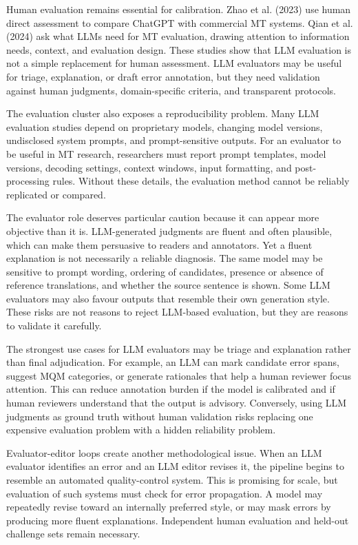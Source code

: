 \documentclass[11pt]{article}
\begin{document}
Human evaluation remains essential for calibration. Zhao et al. (2023) use human direct assessment to compare ChatGPT with commercial MT systems. Qian et al. (2024) ask what LLMs need for MT evaluation, drawing attention to information needs, context, and evaluation design. These studies show that LLM evaluation is not a simple replacement for human assessment. LLM evaluators may be useful for triage, explanation, or draft error annotation, but they need validation against human judgments, domain-specific criteria, and transparent protocols.

The evaluation cluster also exposes a reproducibility problem. Many LLM evaluation studies depend on proprietary models, changing model versions, undisclosed system prompts, and prompt-sensitive outputs. For an evaluator to be useful in MT research, researchers must report prompt templates, model versions, decoding settings, context windows, input formatting, and post-processing rules. Without these details, the evaluation method cannot be reliably replicated or compared.


The evaluator role deserves particular caution because it can appear more objective than it is. LLM-generated judgments are fluent and often plausible, which can make them persuasive to readers and annotators. Yet a fluent explanation is not necessarily a reliable diagnosis. The same model may be sensitive to prompt wording, ordering of candidates, presence or absence of reference translations, and whether the source sentence is shown. Some LLM evaluators may also favour outputs that resemble their own generation style. These risks are not reasons to reject LLM-based evaluation, but they are reasons to validate it carefully.

The strongest use cases for LLM evaluators may be triage and explanation rather than final adjudication. For example, an LLM can mark candidate error spans, suggest MQM categories, or generate rationales that help a human reviewer focus attention. This can reduce annotation burden if the model is calibrated and if human reviewers understand that the output is advisory. Conversely, using LLM judgments as ground truth without human validation risks replacing one expensive evaluation problem with a hidden reliability problem.

Evaluator-editor loops create another methodological issue. When an LLM evaluator identifies an error and an LLM editor revises it, the pipeline begins to resemble an automated quality-control system. This is promising for scale, but evaluation of such systems must check for error propagation. A model may repeatedly revise toward an internally preferred style, or may mask errors by producing more fluent explanations. Independent human evaluation and held-out challenge sets remain necessary.
\end{document}
